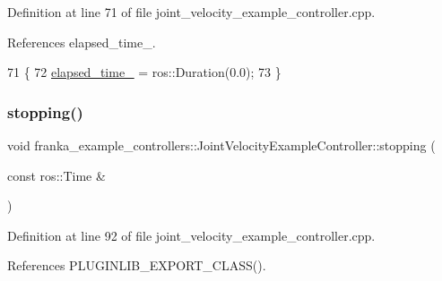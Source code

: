 Definition at line 71 of file joint\+\_\+velocity\+\_\+example\+\_\+controller.\+cpp.



References elapsed\+\_\+time\+\_\+.


\begin{DoxyCode}
71                                                               \{
72   \hyperlink{classfranka__example__controllers_1_1JointVelocityExampleController_a39a8d082e948e285156244f678b8e627}{elapsed\_time\_} = ros::Duration(0.0);
73 \}
\end{DoxyCode}
\mbox{\label{classfranka__example__controllers_1_1JointVelocityExampleController_ae7557a0ea289d4d427f393fd5a4866b5}} 
\subsubsection{\texorpdfstring{stopping()}{stopping()}}
{\footnotesize\ttfamily void franka\+\_\+example\+\_\+controllers\+::\+Joint\+Velocity\+Example\+Controller\+::stopping (\begin{DoxyParamCaption}\item[{const ros\+::\+Time \&}]{ }\end{DoxyParamCaption})\hspace{0.3cm}{\ttfamily [override]}}



Definition at line 92 of file joint\+\_\+velocity\+\_\+example\+\_\+controller.\+cpp.



References P\+L\+U\+G\+I\+N\+L\+I\+B\+\_\+\+E\+X\+P\+O\+R\+T\+\_\+\+C\+L\+A\+S\+S().


